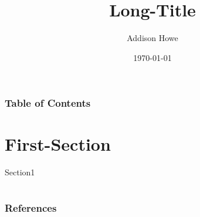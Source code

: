 \documentclass[aspectratio=169,xcolor=svgnames]{beamer}
\title[short-title]{Long-Title}
\subtitle{}
\author[Addison Howe]{
	Addison Howe
}
\date{\today}
\begin{document}
\begingroup
\makeatletter
\makeatother
\begin{frame}[plain]
\maketitle
\end{frame}
\endgroup

\begin{frame}
\frametitle{Table of Contents}
\tableofcontents
\end{frame}


\section{First-Section}

\begin{frame}{Section1}
    
\end{frame}


\section*{}
\begin{frame}[t, allowframebreaks]\frametitle{References}
    \printbibliography
\end{frame}
\end{document}
